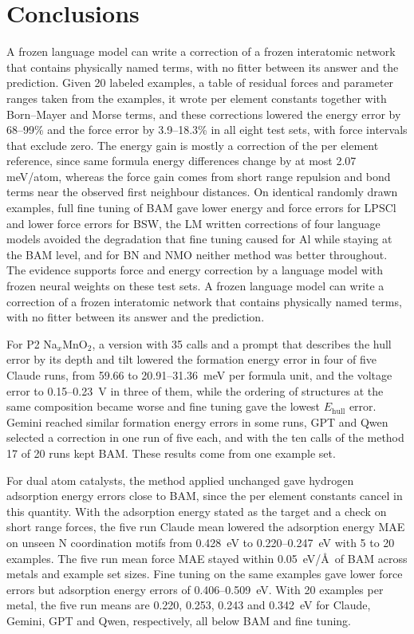 \FloatBarrier

\section{Conclusions}

\ifbulk
A frozen language model can write a correction of a frozen interatomic network that contains physically named terms, with no fitter between its answer and the prediction. Given 20 labeled examples, a table of residual forces and parameter ranges taken from the examples, it wrote per element constants together with Born--Mayer and Morse terms, and these corrections lowered the energy error by 68--99\% and the force error by 3.9--18.3\% in all eight test sets, with force intervals that exclude zero. The energy gain is mostly a correction of the per element reference, since same formula energy differences change by at most 2.07 meV/atom, whereas the force gain comes from short range repulsion and bond terms near the observed first neighbour distances. On identical randomly drawn examples, full fine tuning of BAM gave lower energy and force errors for LPSCl and lower force errors for BSW, the LM written corrections of four language models avoided the degradation that fine tuning caused for Al while staying at the BAM level, and for BN and NMO neither method was better throughout. The evidence supports force and energy correction by a language model with frozen neural weights on these test sets.
\else
A frozen language model can write a correction of a frozen interatomic network that contains physically named terms, with no fitter between its answer and the prediction.
\fi

For P2 Na$_x$MnO$_2$, a version with 35 calls and a prompt that describes the hull error by its depth and tilt lowered the formation energy error in four of five Claude runs, from 59.66 to 20.91--31.36~meV per formula unit, and the voltage error to 0.15--0.23~V in three of them, while the ordering of structures at the same composition became worse and fine tuning gave the lowest $E_{\mathrm{hull}}$ error. Gemini reached similar formation energy errors in some runs, GPT and Qwen selected a correction in one run of five each, and with the ten calls of the method 17 of 20 runs kept BAM. These results come from one example set.

For dual atom catalysts, the method applied unchanged gave hydrogen adsorption energy errors close to BAM, since the per element constants cancel in this quantity. With the adsorption energy stated as the target and a check on short range forces, the five run Claude mean lowered the adsorption energy MAE on unseen N coordination motifs from 0.428~eV to 0.220--0.247~eV with 5 to 20 examples. The five run mean force MAE stayed within 0.05~eV/\AA\ of BAM across metals and example set sizes. Fine tuning on the same examples gave lower force errors but adsorption energy errors of 0.406--0.509~eV. With 20 examples per metal, the five run means are 0.220, 0.253, 0.243 and 0.342~eV for Claude, Gemini, GPT and Qwen, respectively, all below BAM and fine tuning.

